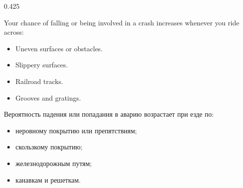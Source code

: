 


\begin{langblock}{0.425}
	\begin{eng}
	
	Your chance of falling or being involved in a crash increases whenever you ride across:
	
	\begin{itemize}[noitemsep]
		\item Uneven surfaces or obstacles.
		\item Slippery surfaces.
		\item Railroad tracks.
		\item Grooves and gratings.
	\end{itemize}
	\end{eng}
	\begin{rus}
		
		Вероятность падения или попадания в аварию возрастает при езде по:
		
		\begin{itemize}[noitemsep]
			\item неровному покрытию или препятствиям;
			\item скользкому покрытию;
			\item железнодорожным путям;
			\item канавкам и решеткам.
		\end{itemize}
\end{rus}
\end{langblock}





